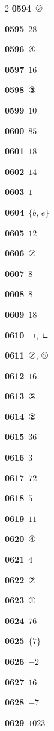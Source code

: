 \documentclass[10pt,a4paper]{article}
\begin{document}
\begin{multicols}{2}
\noindent\textbf{0594}\ ②\par
\noindent\textbf{0595}\ $28$\par
\noindent\textbf{0596}\ ④\par
\noindent\textbf{0597}\ $16$\par
\noindent\textbf{0598}\ ③\par
\noindent\textbf{0599}\ $10$\par
\noindent\textbf{0600}\ $85$\par
\noindent\textbf{0601}\ $18$\par
\noindent\textbf{0602}\ $14$\par
\noindent\textbf{0603}\ $1$\par
\noindent\textbf{0604}\ $\{b,\,e\}$\par
\noindent\textbf{0605}\ $12$\par
\noindent\textbf{0606}\ ②\par
\noindent\textbf{0607}\ $8$\par
\noindent\textbf{0608}\ $8$\par
\noindent\textbf{0609}\ $18$\par
\noindent\textbf{0610}\ ㄱ, ㄴ\par
\noindent\textbf{0611}\ ②, ⑤\par
\noindent\textbf{0612}\ $16$\par
\noindent\textbf{0613}\ ⑤\par
\noindent\textbf{0614}\ ②\par
\noindent\textbf{0615}\ $36$\par
\noindent\textbf{0616}\ $3$\par
\noindent\textbf{0617}\ $72$\par
\noindent\textbf{0618}\ $5$\par
\noindent\textbf{0619}\ $11$\par
\noindent\textbf{0620}\ ④\par
\noindent\textbf{0621}\ $4$\par
\noindent\textbf{0622}\ ②\par
\noindent\textbf{0623}\ ①\par
\noindent\textbf{0624}\ $76$\par
\noindent\textbf{0625}\ $\{7\}$\par
\noindent\textbf{0626}\ $-2$\par
\noindent\textbf{0627}\ $16$\par
\noindent\textbf{0628}\ $-7$\par
\noindent\textbf{0629}\ $1023$\par

\end{multicols}
\end{document}
